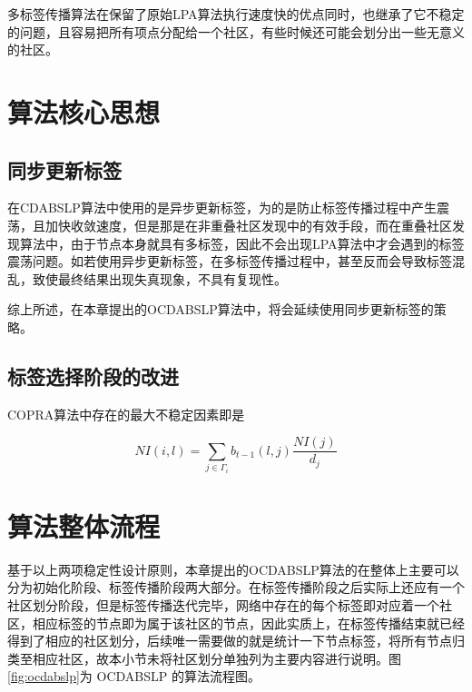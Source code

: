 多标签传播算法在保留了原始LPA算法执行速度快的优点同时，也继承了它不稳定的问题，且容易把所有项点分配给一个社区，有些时候还可能会划分出一些无意义的社区。

\section{算法核心思想}

\subsection{同步更新标签}

在CDABSLP算法中使用的是异步更新标签，为的是防止标签传播过程中产生震荡，且加快收敛速度，但是那是在非重叠社区发现中的有效手段，而在重叠社区发现算法中，由于节点本身就具有多标签，因此不会出现LPA算法中才会遇到的标签震荡问题。如若使用异步更新标签，在多标签传播过程中，甚至反而会导致标签混乱，致使最终结果出现失真现象，不具有复现性。

综上所述，在本章提出的OCDABSLP算法中，将会延续使用同步更新标签的策略。

\subsection{标签选择阶段的改进}

COPRA算法中存在的最大不稳定因素即是

\begin{equation}
  \label{eqn:LI2}
  NI(i,l)=\sum_{j \in \Gamma _i} b_{t-1}(l,j) \frac{NI(j)}{d_j}
\end{equation}

\section{算法整体流程}

基于以上两项稳定性设计原则，本章提出的OCDABSLP算法的在整体上主要可以分为初始化阶段、标签传播阶段两大部分。在标签传播阶段之后实际上还应有一个社区划分阶段，但是标签传播迭代完毕，网络中存在的每个标签即对应着一个社区，相应标签的节点即为属于该社区的节点，因此实质上，在标签传播结束就已经得到了相应的社区划分，后续唯一需要做的就是统计一下节点标签，将所有节点归类至相应社区，故本小节未将社区划分单独列为主要内容进行说明。图\ref{fig:ocdabslp}为 OCDABSLP 的算法流程图。

